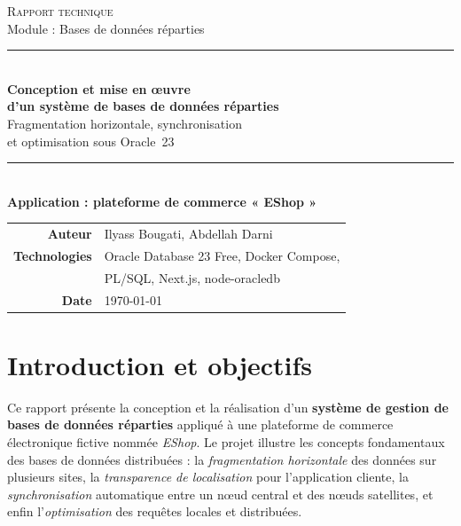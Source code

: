 \documentclass[11pt,a4paper]{article}
\begin{document}
\begin{titlepage}
\centering
\vspace*{1.5cm}

{\Large\scshape Rapport technique}\\[0.4cm]
{\large Module : Bases de données réparties}\\[2.0cm]

\rule{\linewidth}{0.6pt}\\[0.5cm]
{\huge\bfseries Conception et mise en œuvre\\[0.3cm]
d'un système de bases de données réparties}\\[0.4cm]
{\Large Fragmentation horizontale, synchronisation\\ et optimisation sous Oracle~23}\\[0.5cm]
\rule{\linewidth}{0.6pt}\\[2.0cm]

{\large\textbf{Application : plateforme de commerce « EShop »}}\\[2.5cm]

\begin{tabular}{rl}
\textbf{Auteur} & Ilyass Bougati, Abdellah Darni\\[0.3cm]
\textbf{Technologies} & Oracle Database 23 Free, Docker Compose, \\
                      & PL/SQL, Next.js, node-oracledb \\[0.3cm]
\textbf{Date} & \today \\
\end{tabular}

\vfill
\end{titlepage}

\tableofcontents
\newpage

\section{Introduction et objectifs}

Ce rapport présente la conception et la réalisation d'un \textbf{système de
gestion de bases de données réparties} appliqué à une plateforme de commerce
électronique fictive nommée \emph{EShop}. Le projet illustre les concepts
fondamentaux des bases de données distribuées : la \emph{fragmentation
horizontale} des données sur plusieurs sites, la \emph{transparence de
localisation} pour l'application cliente, la \emph{synchronisation}
automatique entre un nœud central et des nœuds satellites, et enfin
l'\emph{optimisation} des requêtes locales et distribuées.
\end{document}
